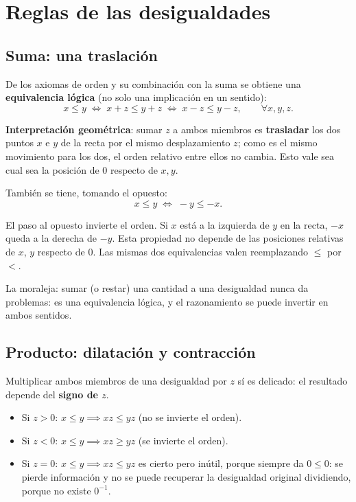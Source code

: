 \documentclass[12pt,a4paper]{article}
\begin{document}
\section{Reglas de las desigualdades}

\subsection{Suma: una traslación}

De los axiomas de orden y su combinación con la suma se obtiene una
\textbf{equivalencia lógica} (no solo una implicación en un sentido):
$$x \leq y \;\Longleftrightarrow\; x + z \leq y + z \;\Longleftrightarrow\; x - z \leq y - z, \qquad \forall x,y,z.$$

\textbf{Interpretación geométrica}: sumar $z$ a ambos miembros es
\textbf{trasladar} los dos puntos $x$ e $y$ de la recta por el mismo
desplazamiento $z$; como es el mismo movimiento para los dos, el orden
relativo entre ellos no cambia. Esto vale sea cual sea la posición de $0$
respecto de $x,y$.

También se tiene, tomando el opuesto:
$$x \leq y \;\Longleftrightarrow\; -y \leq -x.$$

\begin{warnbox}
El paso al opuesto invierte el orden. Si $x$ está a la izquierda de $y$ en
la recta, $-x$ queda a la derecha de $-y$. Esta propiedad no depende de las
posiciones relativas de $x$, $y$ respecto de $0$. Las mismas dos
equivalencias valen reemplazando $\leq$ por $<$.
\end{warnbox}

La moraleja: sumar (o restar) una cantidad a una desigualdad nunca da
problemas: es una equivalencia lógica, y el razonamiento se puede invertir
en ambos sentidos.

\subsection{Producto: dilatación y contracción}

Multiplicar ambos miembros de una desigualdad por $z$ sí es delicado: el
resultado depende del \textbf{signo de $z$}.

\begin{itemize}
  \item Si $z > 0$: $x \leq y \implies xz \leq yz$ (no se invierte el
    orden).
  \item Si $z < 0$: $x \leq y \implies xz \geq yz$ (se invierte el orden).
  \item Si $z = 0$: $x \leq y \implies xz \leq yz$ es cierto pero inútil,
    porque siempre da $0 \leq 0$: se pierde información y no se puede
    recuperar la desigualdad original dividiendo, porque no existe
    $0^{-1}$.
\end{itemize}
\end{document}
